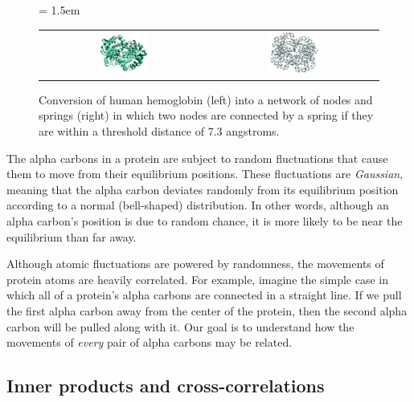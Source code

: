 \begin{figure}[h]
	\centering
	\tabcolsep = 1.5em
	\mySfFamily
	\begin{tabular}{c c}
		\includegraphics[width = 0.3\textwidth]{../images_CMYK/hemoglobin} & \includegraphics[width = 0.3\textwidth]{../images_CMYK/hemoglobin_network}
	\end{tabular}
	\caption{Conversion of human hemoglobin (left) into a network of nodes and springs (right) in which two nodes are connected by a spring if they are within a threshold distance of 7.3 angstroms.}
	\label{fig:hemoglobin_enm}
\end{figure}

The alpha carbons in a protein are subject to random fluctuations that cause them to move from their equilibrium positions. These fluctuations are \textit{Gaussian}, meaning that the alpha carbon deviates randomly from its equilibrium position according to a normal (bell-shaped) distribution. In other words, although an alpha carbon's position is due to random chance, it is more likely to be near the equilibrium than far away.

Although atomic fluctuations are powered by randomness, the movements of protein atoms are heavily correlated. For example, imagine the simple case in which all of a protein's alpha carbons are connected in a straight line. If we pull the first alpha carbon away from the center of the protein, then the second alpha carbon will be pulled along with it. Our goal is to understand how the movements of \textit{every} pair of alpha carbons may be related.

\subsection{Inner products and cross-correlations}


